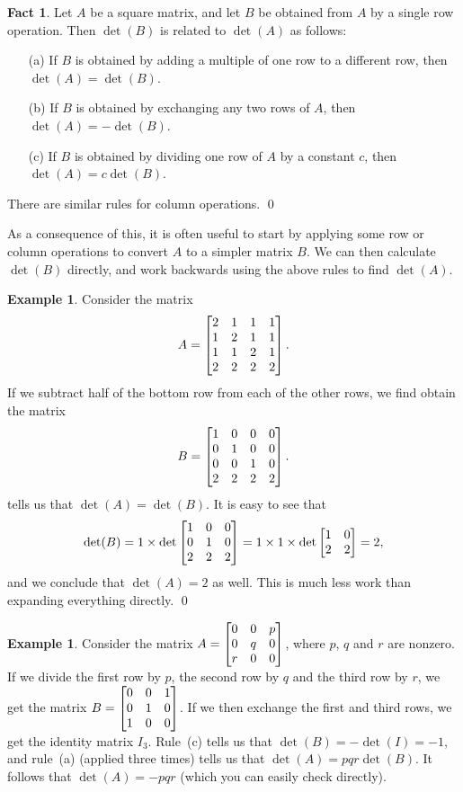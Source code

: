 \documentclass[a4paper]{book}
\theoremstyle{definition}
\newtheorem{fact}[theorem]{Fact}
\newtheorem{example}[theorem]{Example}
\begin{document}
\begin{fact}
 Let $A$ be a square matrix, and let $B$ be obtained from $A$ by a
 single row operation.  Then $\det(B)$ is related to $\det(A)$ as
 follows: 
 \begin{itemize}
  \item[(a)] If $B$ is obtained by adding a multiple of one row to a
   different row, then $\det(A)=\det(B)$.
  \item[(b)] If $B$ is obtained by exchanging any two rows of $A$, then
   $\det(A)=-\det(B)$.
  \item[(c)] If $B$ is obtained by dividing one row of $A$ by a
   constant $c$, then $\det(A)=c\det(B)$.
 \end{itemize}
 There are similar rules for column operations. \qed
\end{fact}
As a consequence of this, it is often useful to start by applying some
row or column operations to convert $A$ to a simpler matrix $B$.  We
can then calculate $\det(B)$ directly, and work backwards using the
above rules to find $\det(A)$.
\begin{example}
 Consider the matrix 
 {\small \[ A=\begin{bmatrix} 2&1&1&1 \\ 1&2&1&1 \\ 1&1&2&1 \\  2&2&2&2 \end{bmatrix}.\]} 
 If we subtract half of the bottom row from each of the other rows,
 we find obtain the matrix
 {\small \[ B=\begin{bmatrix} 1&0&0&0 \\ 0&1&0&0 \\ 0&0&1&0 \\  2&2&2&2 \end{bmatrix}.\]}
  tells us that $\det(A)=\det(B)$.
 It is easy to see that
 \[ \det(B) = 1\times \det\begin{bmatrix} 1&0&0\\0&1&0\\2&2&2 \end{bmatrix} 
            = 1\times 1\times \det\begin{bmatrix} 1&0\\2&2 \end{bmatrix} = 2,
 \]
 and we conclude that $\det(A)=2$ as well.  This is much less work
 than expanding everything directly.
 \qed
\end{example}
\begin{example}
 Consider the matrix $A=\begin{bmatrix} 0&0&p\\ 0&q&0\\ r&0&0\end{bmatrix}$, where $p$,
 $q$ and $r$ are nonzero.  If we divide the first row by $p$, the
 second row by $q$ and the third row by $r$, we get the matrix
 $B=\begin{bmatrix} 0&0&1\\ 0&1&0\\ 1&0&0\end{bmatrix}$.  If we then exchange the first and
 third rows, we get the identity matrix $I_3$.  Rule~(c) tells us that
 $\det(B)=-\det(I)=-1$, and rule~(a) (applied three times) tells us
 that $\det(A)=pqr\det(B)$.  It follows that $\det(A)=-pqr$ (which you
 can easily check directly).
\end{example}
\end{document}
